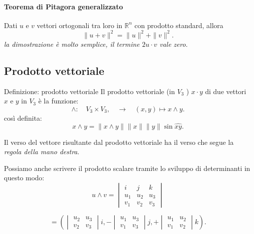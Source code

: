 \documentclass[x11names]{article}
\begin{document}
\begin{center}
\colorbox{Bisque1}{\begin{minipage}{5.75in}
\begin{yes}{}
\paragraph{Teorema di Pitagora generalizzato}
Dati $u$ e $v$ vettori ortogonali tra loro in $\mathbb{R}^n$ con prodotto standard, allora
\[
\|u+v\|^2 = \|u\|^2 + \|v\|^2
.\] 
\textit{la dimostrazione è molto semplice, il termine $2u\cdot v$ vale zero.}
\end{yes}
\end{minipage}}        
\end{center}


\subsection{Prodotto vettoriale}

\begin{center}
\colorbox{myblue}{\begin{minipage}{5.75in}
\begin{blues}{Definizione: prodotto vettoriale}
Il prodotto vettoriale (in $V_3$ ) $x\cdot y$ di due vettori $x$ e $y$ in $V_3$ è la funzione:
\[
\wedge : \quad V_3 \times V_3, \quad \longrightarrow \quad \left(x,y\right) \mapsto x \wedge y
.\] 
così definita:
\[
x \wedge y  = \|x\wedge y\| \|x\| \|y\| \sin{\hat{xy}}
.\] 

\end{blues}
\end{minipage}}        
\end{center}
Il verso del vettore risultante dal prodotto vettoriale ha il verso che segue la \textit{regola della mano destra}.


\noindent
Possiamo anche scrivere il prodotto scalare tramite lo sviluppo di determinanti in questo modo:
\[
u \wedge v = 
\begin{vmatrix}
     i& j & k \\
     u_1& u_2 & u_3 \\
     v_1& v_2 & v_3 
\end{vmatrix}
\] 

\[
	=
\left(
\begin{vmatrix}
    u_2 & u_3  \\
     v_2& v_3  
\end{vmatrix}i,
- \begin{vmatrix}
    u_1 &u_3 \\
     v_1&v_3   
\end{vmatrix}j, +
\begin{vmatrix}
    u_1 & u_2 \\
     v_1 &  v_2   
\end{vmatrix}k
\right)
.\] 
\end{document}
